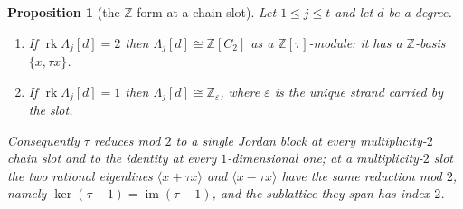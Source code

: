\documentclass[reqno]{amsart}
\theoremstyle{plain}
\newtheorem{proposition}[theorem]{Proposition}
\theoremstyle{definition}
\DeclareMathOperator{\im}{im}
\newcommand{\eps}{\varepsilon}
\begin{document}
\begin{proposition}[the $\mathbb{Z}$-form at a chain slot]\label{prop:zslot}
Let $1\le j\le t$ and let $d$ be a degree.
\begin{enumerate}
\item If $\operatorname{rk}\Lambda_j[d]=2$ then $\Lambda_j[d]\cong
\mathbb{Z}[C_2]$ as a $\mathbb{Z}[\tau]$-module: it has a $\mathbb{Z}$-basis
$\{x,\tau x\}$.
\item If $\operatorname{rk}\Lambda_j[d]=1$ then $\Lambda_j[d]\cong
\mathbb{Z}_{\eps}$, where $\eps$ is the unique strand carried by the slot.
\end{enumerate}
Consequently $\tau$ reduces mod $2$ to a single Jordan block at every
multiplicity-$2$ chain slot and to the identity at every $1$-dimensional one;
at a multiplicity-$2$ slot the two rational eigenlines
$\langle x+\tau x\rangle$ and $\langle x-\tau x\rangle$ have the same
reduction mod $2$, namely $\ker(\tau-1)=\im(\tau-1)$, and the sublattice they
span has index $2$.
\end{proposition}
\end{document}
